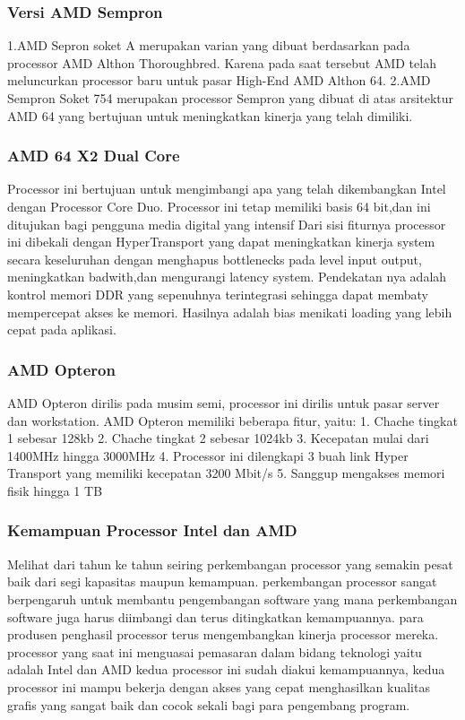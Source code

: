  			\subsubsection {Versi AMD Sempron}
 	 1.AMD Sepron soket A merupakan varian yang dibuat berdasarkan pada processor AMD Althon Thoroughbred. Karena pada saat tersebut AMD telah meluncurkan processor baru untuk pasar High-End AMD Althon 64.
 	 2.AMD Sempron Soket 754 merupakan processor Sempron yang dibuat di atas arsitektur AMD 64 yang bertujuan untuk meningkatkan kinerja yang telah dimiliki.


			\subsubsection{AMD 64 X2 Dual Core}
 	Processor ini bertujuan untuk mengimbangi apa yang telah dikembangkan Intel dengan Processor Core Duo. Processor ini tetap memiliki basis 64 bit,dan ini ditujukan bagi pengguna media digital yang intensif
 	Dari sisi fiturnya processor ini dibekali dengan HyperTransport yang dapat meningkatkan kinerja system secara keseluruhan dengan menghapus bottlenecks pada level input output, meningkatkan badwith,dan mengurangi latency system. Pendekatan nya adalah kontrol memori DDR yang sepenuhnya terintegrasi sehingga dapat membaty mempercepat akses ke memori. Hasilnya adalah bias menikati loading yang lebih cepat pada aplikasi.


 			\subsubsection{AMD Opteron}
	AMD Opteron dirilis pada musim semi, processor ini dirilis untuk pasar server dan workstation. AMD Opteron memiliki beberapa fitur, yaitu:
		1. Chache tingkat 1 sebesar 128kb
		2. Chache tingkat 2 sebesar 1024kb
		3. Kecepatan mulai dari 1400MHz hingga 3000MHz
		4. Processor ini dilengkapi 3 buah link Hyper Transport yang memiliki kecepatan 3200 Mbit/s
		5. Sanggup mengakses memori fisik hingga 1 TB 


			

			\subsubsection{Kemampuan Processor Intel dan AMD}
 	Melihat dari tahun ke tahun seiring perkembangan processor yang semakin pesat baik dari segi kapasitas maupun kemampuan. perkembangan processor sangat berpengaruh untuk membantu pengembangan software yang mana perkembangan software juga harus diimbangi dan terus ditingkatkan kemampuannya. para produsen penghasil processor terus mengembangkan kinerja processor mereka. processor yang saat ini menguasai pemasaran dalam bidang teknologi yaitu adalah Intel dan AMD kedua processor ini sudah diakui kemampuannya, kedua processor ini mampu bekerja dengan akses yang cepat menghasilkan kualitas grafis yang sangat baik dan cocok sekali bagi para pengembang program.\cite{irwansyah2014pengantar} 




